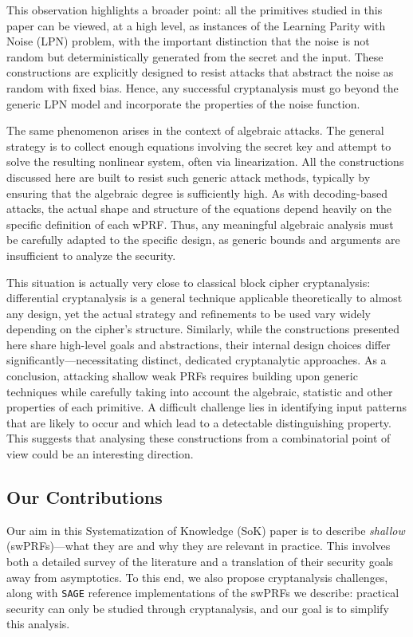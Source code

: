 This observation highlights a broader point: all the primitives studied in this paper can be viewed, at a high level, as instances of the Learning Parity with Noise (LPN) problem, with the important distinction that the noise is not random but deterministically generated from the secret and the input. These constructions are explicitly designed to resist attacks that abstract the noise as random with fixed bias. Hence, any successful cryptanalysis must go beyond the generic LPN model and incorporate the properties of the noise function.

The same phenomenon arises in the context of algebraic attacks. The general strategy is to collect enough equations involving the secret key and attempt to solve the resulting nonlinear system, often via linearization. All the constructions discussed here are built to resist such generic attack methods, typically by ensuring that the algebraic degree is sufficiently high. As with decoding-based attacks, the actual shape and structure of the equations depend heavily on the specific definition of each wPRF. Thus, any meaningful algebraic analysis must be carefully adapted to the specific design, as generic bounds and arguments are insufficient to analyze the security.

This situation is actually very close to classical block cipher cryptanalysis: differential cryptanalysis is a general technique applicable theoretically to almost any design, yet the actual strategy and refinements to be used vary widely depending on the cipher’s structure. Similarly, while the constructions presented here share high-level goals and abstractions, their internal design choices differ significantly—necessitating distinct, dedicated cryptanalytic approaches. As a conclusion, attacking shallow weak PRFs requires building upon generic techniques while carefully taking into account the algebraic, statistic and other properties of each primitive. A difficult challenge lies in identifying input patterns that are likely to occur and which lead to a detectable distinguishing property. This suggests that analysing these constructions from a combinatorial point of view could be an interesting direction. 


\subsection{Our Contributions}


Our aim in this Systematization of Knowledge (SoK) paper is to describe \emph{shallow} \wPRF (swPRFs)—what they are and why they are relevant in practice. This involves both a detailed survey of the literature and a translation of their security goals away from asymptotics. To this end, we also propose cryptanalysis challenges, along with \texttt{SAGE} reference implementations of the swPRFs we describe: practical security can only be studied through cryptanalysis, and our goal is to simplify this analysis. 


